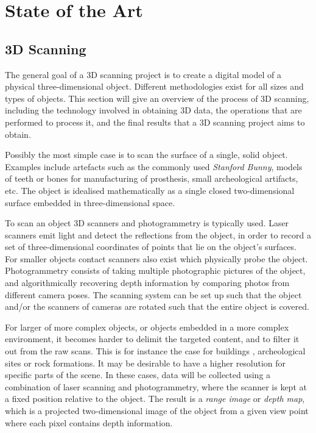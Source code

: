 \chapter{State of the Art}

\section{3D Scanning}
The general goal of a 3D scanning project is to create a digital model of a physical three-dimensional object. Different methodologies exist for all sizes and types of objects. This section will give an overview of the process of 3D scanning, including the technology involved in obtaining 3D data, the operations that are performed to process it, and the final results that a 3D scanning project aims to obtain.

Possibly the most simple case is to scan the surface of a single, solid object. Examples include artefacts such as the commonly used \emph{Stanford Bunny}, models of teeth or bones for manufacturing of prosthesis, small archeological artifacts, etc. The object is idealised mathematically as a single closed two-dimensional surface embedded in three-dimensional space.

To scan an object 3D scanners and photogrammetry is typically used.  Laser scanners emit light and detect the reflections from the object, in order to record a set of three-dimensional coordinates of points that lie on the object's surfaces. For smaller objects contact scanners also exist which physically probe the object. Photogrammetry consists of taking multiple photographic pictures of the object, and algorithmically recovering depth information by comparing photos from different camera poses. The scanning system can be set up such that the object and/or the scanners of cameras are rotated such that the entire object is covered.

For larger of more complex objects, or objects embedded in a more complex environment, it becomes harder to delimit the targeted content, and to filter it out from the raw scans. This is for instance the case for buildings \cite{Kers2006}, archeological sites \cite{Web1} \cite{Kein2011} \cite{Grus2012} or rock formations. It may be desirable to have a higher resolution for specific parts of the scene. In these cases, data will be collected using a combination of laser scanning and photogrammetry, where the scanner is kept at a fixed position relative to the object. The result is a \emph{range image} or \emph{depth map}, which is a projected two-dimensional image of the object from a given view point where each pixel contains depth information.

